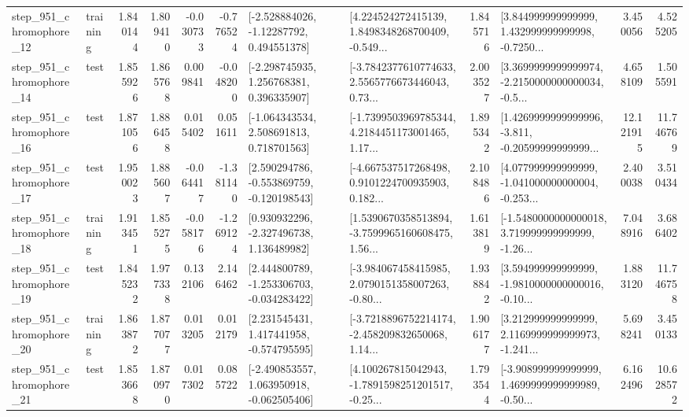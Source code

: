 \begin{tabular}{llrrrrllrlrr}
  step\_951\_chromophore\_12 &  training &      1.840144 &    1.809410 &     -0.030733 & -0.776524 &    [-2.528884026, -1.12287792, 0.494551378] &  [4.224524272415139, 1.8498348268700409, -0.549... &       1.845716 &  [3.844999999999999, 1.432999999999998, -0.7250... &            3.450056 &          4.525205 \\
  step\_951\_chromophore\_14 &      test &      1.855926 &    1.865768 &      0.009841 & -0.048200 &    [-2.298745935, 1.256768381, 0.396335907] &  [-3.7842377610774633, 2.5565776673446043, 0.73... &       2.003527 &  [3.3699999999999974, -2.2150000000000034, -0.5... &            4.658109 &          1.505591 \\
  step\_951\_chromophore\_16 &      test &      1.871056 &    1.886458 &      0.015402 &  0.051611 &    [-1.064343534, 2.508691813, 0.718701563] &  [-1.7399503969785344, 4.2184451173001465, 1.17... &       1.895342 &  [1.4269999999999996, -3.811, -0.20599999999999... &           12.121915 &         11.746769 \\
  step\_951\_chromophore\_17 &      test &      1.950023 &    1.885607 &     -0.064417 & -1.381140 &   [2.590294786, -0.553869759, -0.120198543] &  [-4.667537517268498, 0.9101224700935903, 0.182... &       2.108486 &  [4.077999999999999, -1.041000000000004, -0.253... &            2.400038 &          3.510434 \\
  step\_951\_chromophore\_18 &  training &      1.913451 &    1.855275 &     -0.058176 & -1.269124 &    [0.930932296, -2.327496738, 1.136489982] &  [1.5390670358513894, -3.7599965160608475, 1.56... &       1.613819 &  [-1.5480000000000018, 3.719999999999999, -1.26... &            7.048916 &          3.686402 \\
  step\_951\_chromophore\_19 &      test &      1.845232 &    1.977338 &      0.132106 &  2.146462 &   [2.444800789, -1.253306703, -0.034283422] &  [-3.984067458415985, 2.0790151358007263, -0.80... &       1.938842 &  [3.594999999999999, -1.9810000000000016, -0.10... &            1.883120 &         11.746758 \\
  step\_951\_chromophore\_20 &  training &      1.863872 &    1.877077 &      0.013205 &  0.012179 &    [2.231545431, 1.417441958, -0.574795595] &  [-3.7218896752214174, -2.458209832650068, 1.14... &       1.906177 &  [3.212999999999999, 2.1169999999999973, -1.241... &            5.698241 &          3.450133 \\
  step\_951\_chromophore\_21 &      test &      1.853668 &    1.870970 &      0.017302 &  0.085722 &   [-2.490853557, 1.063950918, -0.062505406] &  [4.100267815042943, -1.7891598251201517, -0.25... &       1.793544 &  [-3.908999999999999, 1.4699999999999989, -0.50... &            6.162496 &         10.628572 \\

\end{tabular}
